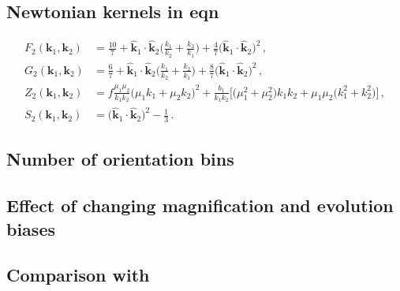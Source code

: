 \subsection*{Newtonian kernels in eqn}
\begin{align}
F_{2}(\bm{k}_{1}, \bm{k}_{2}) &= \frac{10}{7} + {\hat{\bm{k}}_{1} \cdot \hat{\bm{k}}_2}\bigg(\frac{k_{1}}{k_{2}} + \frac{k_{2}}{k_{1}}\bigg) + \frac{4}{7}\big({\hat{\bm{k}}_{1} \cdot \hat{\bm{k}}_2}\big)^{2}\,,
\label{e18} \\
G_{2}(\bm{k}_{1}, \bm{k}_{2}) &= \frac{6}{7} + {\hat{\bm{k}}_{1} \cdot \hat{\bm{k}}_2}\bigg(\frac{k_{1}}{k_{2}} + \frac{k_{2}}{k_{1}}\bigg) + \frac{8}{7}\big({\hat{\bm{k}}_{1} \cdot \hat{\bm{k}}_2}\big)^{2} \label{e19}\,,\\
Z_2(\bm{k}_1,\bm{k}_2) &=
 f \frac{\mu_1\mu_2}{k_1k_2}\big( \mu_1k_1+\mu_2k_2\big)^2 
+ \frac{b_{1}}{k_1k_2}\Big[ \big(\mu_1^2+\mu_2^2 \big)k_1k_2+\mu_1\mu_2\big(k_1^2+k_2^2 \big) \Big]\,, \label{e16x} \\  
S_{2}(\bm{k}_{1}, \bm{k}_{2}) &= \big({\hat{\bm{k}}_{1} \cdot \hat{\bm{k}}_2}\big)^{2} - \frac{1}{3}\,. \label{e20}
\end{align}




\subsection*{{Number of orientation bins}}





\subsection*{{Effect of changing magnification and evolution biases}}



\subsection*{{Comparison with \cite{Jeong:2019igb}}}
